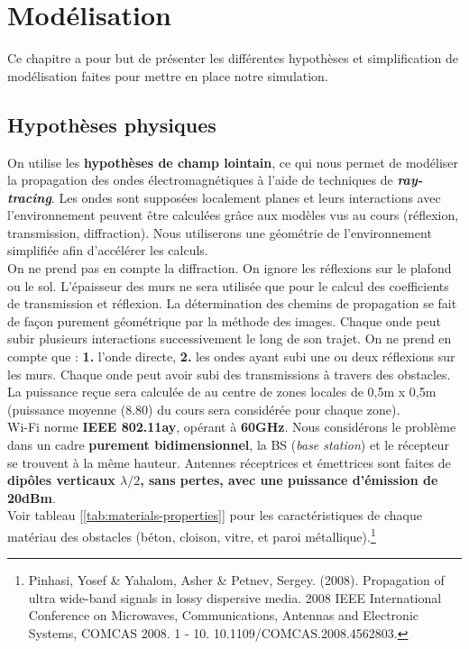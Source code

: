 \chapter{Modélisation}
\label{chaper-1}
Ce chapitre a pour but de présenter les différentes hypothèses et simplification de modélisation faites pour mettre en place notre simulation.

\section{Hypothèses physiques}
On utilise les \textbf{hypothèses de champ lointain}, ce qui nous permet de modéliser la propagation des ondes électromagnétiques à l'aide de techniques de \textbf{\textit{ray-tracing}}. Les ondes sont supposées localement planes et leurs interactions avec l'environnement peuvent être calculées grâce aux modèles vus au cours (réflexion, transmission, diffraction). Nous utiliserons une géométrie de l'environnement simplifiée afin d'accélérer les calculs.\\
On ne prend pas en compte la diffraction. On ignore les réflexions sur le plafond ou le sol. L'épaisseur des murs ne sera utilisée que pour le calcul des coefficients de transmission et réflexion. La détermination des chemins de propagation se fait de façon purement géométrique par la méthode des images. Chaque onde peut subir plusieurs interactions successivement le long de son trajet. On ne prend en compte que : \textbf{1.} l'onde directe, \textbf{2.} les ondes ayant subi une ou deux réflexions sur les murs. Chaque onde peut avoir subi des transmissions à travers des obstacles.\\
La puissance reçue sera calculée de au centre de zones locales de 0,5m x 0,5m (puissance moyenne (8.80) du cours sera considérée pour chaque zone).\\

Wi-Fi norme \textbf{IEEE 802.11ay}, opérant à \textbf{60GHz}. Nous considérons le problème dans un cadre \textbf{purement bidimensionnel}, la BS (\textit{base station}) et le récepteur se trouvent à la même hauteur. Antennes réceptrices et émettrices sont faites de \textbf{dipôles verticaux $\lambda/2$, sans pertes, avec une puissance d'émission de 20dBm}.\\
Voir tableau [\ref{tab:materials-properties}] pour les caractéristiques de chaque matériau des obstacles (béton, cloison, vitre, et paroi métallique).\footnote{Pinhasi, Yosef \& Yahalom, Asher \& Petnev, Sergey. (2008). Propagation of ultra wide-band signals in lossy dispersive media. 2008 IEEE International Conference on Microwaves, Communications, Antennas and Electronic Systems, COMCAS 2008. 1 - 10. 10.1109/COMCAS.2008.4562803.}\\

